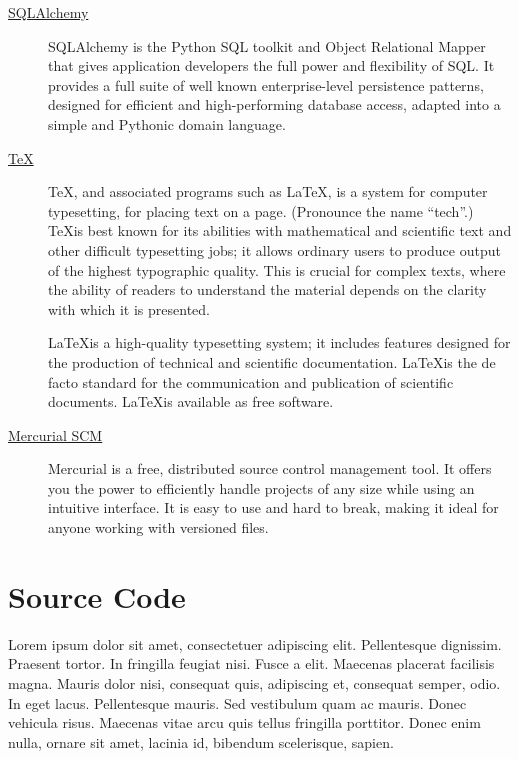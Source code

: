 \documentclass[11pt,letterpaper,onecolumn,twoside,openright,final]{report}
\begin{document}
\begin{description}
\item[\href{http://www.sqlalchemy.org/}{SQLAlchemy}]
SQLAlchemy is the Python SQL toolkit and Object Relational Mapper that gives application developers the full power and flexibility of SQL.
It provides a full suite of well known enterprise-level persistence patterns, designed for efficient and high-performing database access, adapted into a simple and Pythonic domain language.

\item[\href{http://www.ctan.org/}{\TeX}]
\TeX, and associated programs such as \LaTeX, is a system for computer typesetting, for placing text on a page.
(Pronounce the name ``tech''.)
\TeX is best known for its abilities with mathematical and scientific text and other difficult typesetting jobs; it allows ordinary users to produce output of the highest typographic quality.
This is crucial for complex texts, where the ability of readers to understand the material depends on the clarity with which it is presented.

\item[\href{http://www.latex-project.org/}{\LaTeXe}]
\LaTeX is a high-quality typesetting system; it includes features designed for the production of technical and scientific documentation.
\LaTeX is the de facto standard for the communication and publication of scientific documents.
\LaTeX is available as free software.

\item[\href{http://mercurial.selenic.com/}{Mercurial SCM}]
Mercurial is a free, distributed source control management tool.
It offers you the power to efficiently handle projects of any size while using an intuitive interface.
It is easy to use and hard to break, making it ideal for anyone working with versioned files.
\end{description}


\chapter{Source Code}
Lorem ipsum dolor sit amet, consectetuer adipiscing elit. Pellentesque dignissim.
Praesent tortor.
In fringilla feugiat nisi.
Fusce a elit.
Maecenas placerat facilisis magna.
Mauris dolor nisi, consequat quis, adipiscing et, consequat semper, odio.
In eget lacus.
Pellentesque mauris.
Sed vestibulum quam ac mauris.
Donec vehicula risus.
Maecenas vitae arcu quis tellus fringilla porttitor.
Donec enim nulla, ornare sit amet, lacinia id, bibendum scelerisque, sapien.
\end{document}
